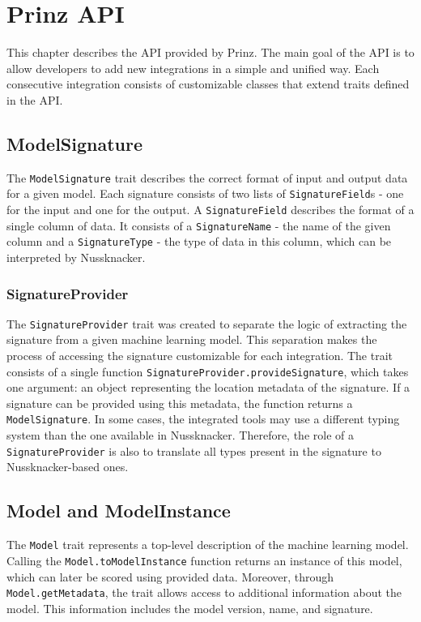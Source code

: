 \chapter{Prinz API}
\label{chap:prinz-api}

This chapter describes the API provided by Prinz.
The main goal of the API is to allow developers to add new integrations in a simple and unified way.
Each consecutive integration consists of customizable classes that extend traits defined in the API.

\section{ModelSignature}
\label{sec:model-signature}

The \texttt{ModelSignature} trait describes the correct format of input and output data for a given model.
Each signature consists of two lists of \texttt{SignatureField}s - one for the input and one for the output.
A \texttt{SignatureField} describes the format of a single column of data.
It consists of a \texttt{SignatureName} - the name of the given column and a \texttt{SignatureType} - the type of data in this column, which can be interpreted by Nussknacker.

\subsection{SignatureProvider}

The \texttt{SignatureProvider} trait was created to separate the logic of extracting the signature from a given machine learning model.
This separation makes the process of accessing the signature customizable for each integration.
The trait consists of a single function \texttt{SignatureProvider.provideSignature}, which takes one argument: an object representing the location metadata of the signature.
If a signature can be provided using this metadata, the function returns a \texttt{ModelSignature}.
In some cases, the integrated tools may use a different typing system than the one available in Nussknacker.
Therefore, the role of a \texttt{SignatureProvider} is also to translate all types present in the signature to Nussknacker-based ones.

\section{Model and ModelInstance}

The \texttt{Model} trait represents a top-level description of the machine learning model.
Calling the \texttt{Model.toModelInstance} function returns an instance of this model, which can later be scored using provided data.
Moreover, through \texttt{Model.getMetadata}, the trait allows access to additional information about the model.
This information includes the model version, name, and signature.

